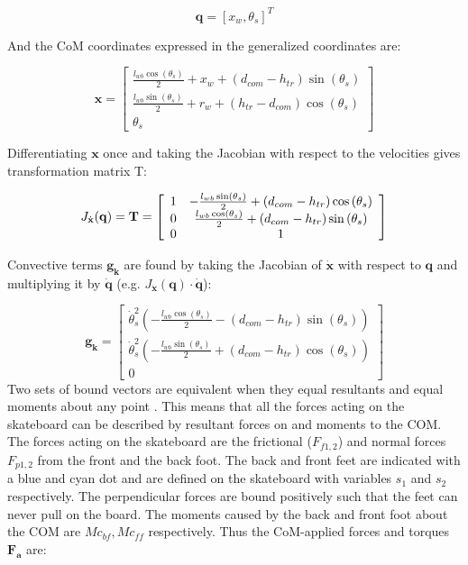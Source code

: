\documentclass[default,iicol]{sn-jnl}
\theoremstyle{thmstyleone}%
\theoremstyle{thmstyletwo}%
\theoremstyle{thmstylethree}%
\begin{document}
\begin{equation}
    \mathbf{q} = [x_w, \theta_s]^T
\end{equation}

And the CoM coordinates expressed in the generalized coordinates are:

\begin{equation}
\mathbf{x}=\left[\begin{array}{c}
\frac{l_{w b} \cos \left(\theta_s\right)}{2}+x_w+\left(d_{c o m}-h_{t r}\right) \sin \left(\theta_s\right) \\
\frac{l_{w b} \sin \left(\theta_s\right)}{2}+r_w+\left(h_{t r}-d_{c o m}\right) \cos \left(\theta_s\right) \\
\theta_s
\end{array}\right]
\end{equation}

Differentiating $\mathbf{x}$ once and taking the Jacobian with respect to the velocities gives transformation matrix T:

\begin{equation}
    J_{\dot{\mathbf{x}}}(\mathbf{q}) = \textbf{T} = \left[\begin{array}{c c}
1 & -\frac{l_{w b} \sin \left(\theta_s\right)}{2}+\left(d_{c o m}-h_{t r}\right) \cos \left(\theta_s\right) \\
0 & \frac{l_{w b} \cos \left(\theta_s\right)}{2}+\left(d_{c o m}-h_{t r}\right) \sin \left(\theta_s\right) \\
0 & 1
\end{array}\right]
\end{equation}

Convective terms $\mathbf{g_k}$ are found by taking the Jacobian of $\mathbf{\dot  x}$ with respect to $\mathbf{q}$ and multiplying it by $\mathbf{\dot  q}$ (e.g. $J_{\mathbf{\dot  x}}(\mathbf{q})\cdot \mathbf{\dot  q}$):

\begin{equation}
\mathbf{g_k} = 
\left[\begin{array}{c}
\dot \theta_s^2\left(-\frac{l_{w b} \cos \left(\theta_s\right)}{2}-\left(d_{c o m}-h_{t r}\right) \sin \left(\theta_s\right)\right) \\
\dot \theta_s^2\left(-\frac{l_{w b} \sin \left(\theta_s\right)}{2}+\left(d_{c o m}-h_{t r}\right) \cos \left(\theta_s\right)\right) \\
0
\end{array}\right]
\end{equation}
Two sets of bound vectors are equivalent when they equal resultants and equal moments about any point \cite{moore_force_nodate}. This means that all the forces acting on the skateboard can be described by resultant forces on and moments to the COM. The forces acting on the skateboard are the frictional ($F_{f1,2}$) and normal forces $F_{p1,2}$ from the front and the back foot. The back and front feet are indicated with a blue and cyan dot and are defined on the skateboard with variables $s_1$ and $s_2$ respectively. The perpendicular forces are bound positively such that the feet can never pull on the board. The moments caused by the back and front foot about the COM are $Mc_{bf}, Mc_{ff}$ respectively. Thus the CoM-applied forces and torques $\mathbf{F_{a}}$ are:
 
\end{document}

